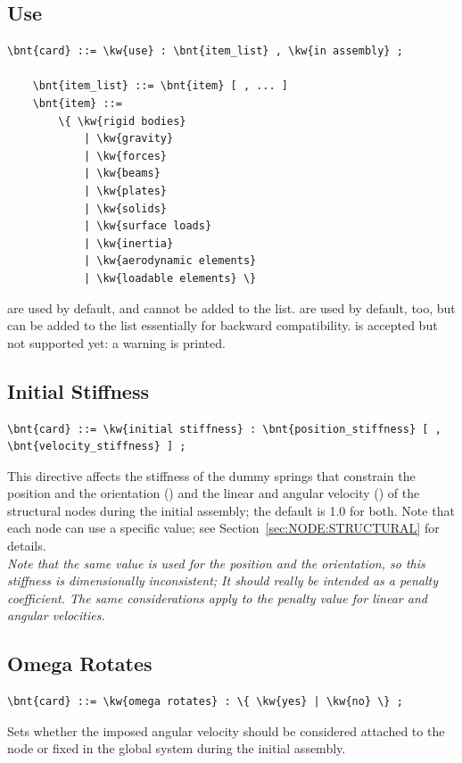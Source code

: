 \subsection{Use}\label{sec:CONTROLDATA:USE}
\begin{Verbatim}[commandchars=\\\{\}]
    \bnt{card} ::= \kw{use} : \bnt{item_list} , \kw{in assembly} ;

    \bnt{item_list} ::= \bnt{item} [ , ... ]
    \bnt{item} ::=
        \{ \kw{rigid bodies}
            | \kw{gravity}
            | \kw{forces}
            | \kw{beams}
            | \kw{plates}
            | \kw{solids}
            | \kw{surface loads}
            | \kw{inertia}
            | \kw{aerodynamic elements}
            | \kw{loadable elements} \} 
\end{Verbatim}
 are used by default, and cannot be added to the list.
 are used by default, too, but can be added to the list
essentially for backward compatibility.  is accepted
but not supported yet: a warning is printed.

\subsection{Initial Stiffness}\label{sec:CONTROLDATA:INITIALSTIFFNESS}
\begin{Verbatim}[commandchars=\\\{\}]
    \bnt{card} ::= \kw{initial stiffness} : \bnt{position_stiffness} [ , \bnt{velocity_stiffness} ] ;
\end{Verbatim}
This directive affects the stiffness of the dummy springs that constrain
the position and the orientation ()
and the linear and angular velocity ()
of the structural nodes during the initial assembly; the default is 1.0 for both.
Note that each node can use a specific value; 
see Section~\ref{sec:NODE:STRUCTURAL} for details. \\
\emph{Note that the same value is used for the position and the orientation,
so this stiffness is dimensionally inconsistent; It should really 
be intended as a penalty coefficient.
The same considerations apply to the penalty value for linear 
and angular velocities.}

\subsection{Omega Rotates}
\begin{Verbatim}[commandchars=\\\{\}]
    \bnt{card} ::= \kw{omega rotates} : \{ \kw{yes} | \kw{no} \} ;
\end{Verbatim}
Sets whether the imposed angular velocity should be considered attached 
to the node or fixed in the global system during the initial assembly.


